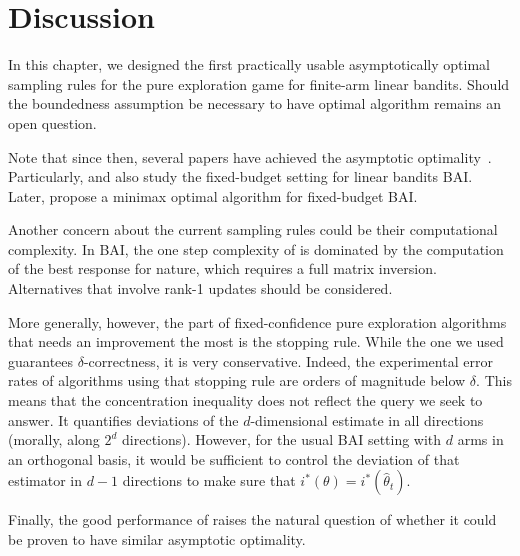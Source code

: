 \section{Discussion}\label{sec:lgc.discussion}

In this chapter, we designed the first practically usable asymptotically optimal sampling rules for the pure exploration game for finite-arm linear bandits. Should the boundedness assumption be necessary to have optimal algorithm remains an open question.

Note that since then, several papers have achieved the asymptotic optimality~\citep{zaki2020linear,jedra2020linear,katz-samuels2020practical}. Particularly, \cite{jedra2020linear} and \cite{katz-samuels2020practical} also study the fixed-budget setting for linear bandits BAI. Later, \cite{yang2021linear} propose a minimax optimal algorithm for fixed-budget BAI.

Another concern about the current sampling rules could be their computational complexity. In BAI, the one step complexity of \LG is dominated by the computation of the best response for nature, which requires a full matrix inversion. Alternatives that involve rank-1 updates should be considered.

More generally, however, the part of fixed-confidence pure exploration algorithms that needs an improvement the most is the stopping rule. While the one we used guarantees $\delta$-correctness, it is very conservative. Indeed, the experimental error rates of algorithms using that stopping rule are orders of magnitude below $\delta$. This means that the concentration inequality does not reflect the query we seek to answer. It quantifies deviations of the $d$-dimensional estimate in all directions (morally, along $2^d$ directions). However, for the usual BAI setting with $d$ arms in an orthogonal basis, it would be sufficient to control the deviation of that estimator in $d-1$ directions to make sure that $i^*(\theta) = i^*(\hat{\theta}_t)$.

Finally, the good performance of \LGapE raises the natural question of whether it could be proven to have similar asymptotic optimality.

